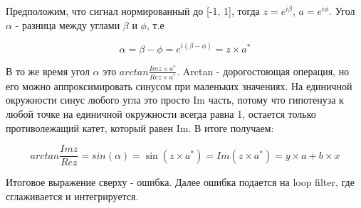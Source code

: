 Предположим, что сигнал нормированный до [-1, 1], тогда $z = e^{i\beta}$, $a = e^{i\phi}$. Угол $\alpha$ - разница между углами
$\beta$ и $\phi$, т.е 

$$\alpha = \beta - \phi = e^{i(\beta - \phi)} = z \times a^*$$

В то же время угол $\alpha$ это $arctan \frac{Im{z\times a^*}}{Re{z\times a^*}}$. Arctan - дорогостоющая операция, но его можно аппроксимировать 
синусом при маленьких значениях. На единичной окружности синус любого угла это просто Im часть, потому что гипотенуза к любой точке 
на единичной окружности всегда равна 1, остается только противолежащий катет, который равен Im. В итоге получаем:

$$arctan \frac{Im{z}}{Re{z}} = sin(\alpha) = \sin(z\times a^*) = Im(z\times a^*) = \boxed{y\times a + b \times x}$$

Итоговое выражение сверху - ошибка. Далее ошибка подается на loop filter, где сглаживается и интегрируется.

\endinput
